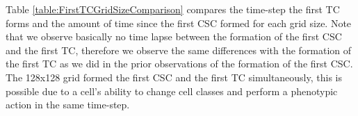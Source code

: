 \documentclass[\main/thesis.tex]{subfiles}
\begin{document}
Table \ref{table:FirstTCGridSizeComparison} compares the time-step the first TC forms and the amount of time since the first CSC formed for each grid size. Note that we observe basically no time lapse between the formation of the first CSC and the first TC, therefore we observe the same differences with the formation of the first TC as we did in the prior observations of the formation of the first CSC. The 128x128 grid formed the first CSC and the first TC simultaneously, this is possible due to a cell’s ability to change cell classes and perform a phenotypic action in the same time-step.
\begin{table}[H]
\centering
{}
\caption{In this table we compare the time-step the first TC forms and the elapsed amount of time it takes a CSC to form the first TC between the various grid sizes.}
\label{table:FirstTCGridSizeComparison} 
\end{table}
\end{document}
